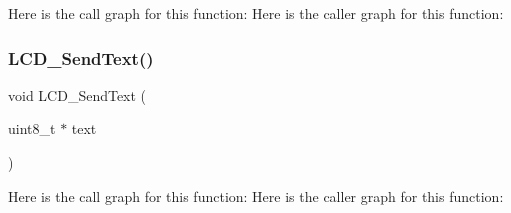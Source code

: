 Here is the call graph for this function\+:
Here is the caller graph for this function\+:
\mbox{\label{lcd4bit_8c_ad0c262e2f73ff4d8d2fd198f76e102a8}} 
\subsubsection{L\+C\+D\+\_\+\+Send\+Text()}
{\footnotesize\ttfamily void L\+C\+D\+\_\+\+Send\+Text (\begin{DoxyParamCaption}\item[{uint8\+\_\+t $\ast$}]{text }\end{DoxyParamCaption})}

Here is the call graph for this function\+:
Here is the caller graph for this function\+:

